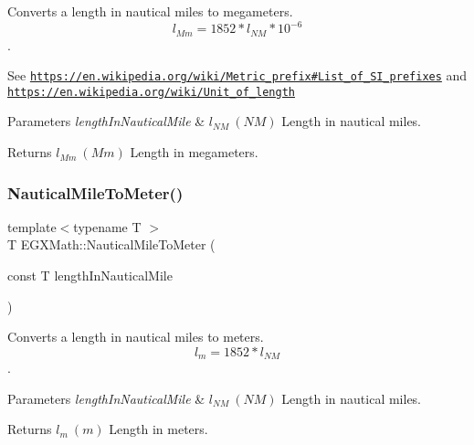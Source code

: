 Converts a length in nautical miles to megameters. \[ l_{Mm}=1852 * l_{NM} * 10^{-6} \]. 

See \href{https://en.wikipedia.org/wiki/Metric_prefix#List_of_SI_prefixes}{\tt https\+://en.\+wikipedia.\+org/wiki/\+Metric\+\_\+prefix\#\+List\+\_\+of\+\_\+\+S\+I\+\_\+prefixes} and \href{https://en.wikipedia.org/wiki/Unit_of_length}{\tt https\+://en.\+wikipedia.\+org/wiki/\+Unit\+\_\+of\+\_\+length} 
\begin{DoxyParams}{Parameters}
{\em length\+In\+Nautical\+Mile} & $ l_{NM}\ (NM)$ Length in nautical miles. \\
\hline
\end{DoxyParams}
\begin{DoxyReturn}{Returns}
$ l_{Mm}\ (Mm)$ Length in megameters. 
\end{DoxyReturn}
\mbox{\label{group___e_g_x_math-_conversions-_length_conversions-_non-_s_i-_nautical_mile-_s_i_ga828e054a1ecb313ed21e6f581110b164}} 
\subsubsection{\texorpdfstring{Nautical\+Mile\+To\+Meter()}{NauticalMileToMeter()}}
{\footnotesize\ttfamily template$<$typename T $>$ \\
T E\+G\+X\+Math\+::\+Nautical\+Mile\+To\+Meter (\begin{DoxyParamCaption}\item[{const T}]{length\+In\+Nautical\+Mile }\end{DoxyParamCaption})}



Converts a length in nautical miles to meters. \[ l_{m}=1852 * l_{NM} \]. 


\begin{DoxyParams}{Parameters}
{\em length\+In\+Nautical\+Mile} & $ l_{NM}\ (NM)$ Length in nautical miles. \\
\hline
\end{DoxyParams}
\begin{DoxyReturn}{Returns}
$ l_{m}\ (m)$ Length in meters. 
\end{DoxyReturn}
\mbox{\label{group___e_g_x_math-_conversions-_length_conversions-_non-_s_i-_nautical_mile-_s_i_ga8ce271a279676a3461dddc59c6a9720b}} 
